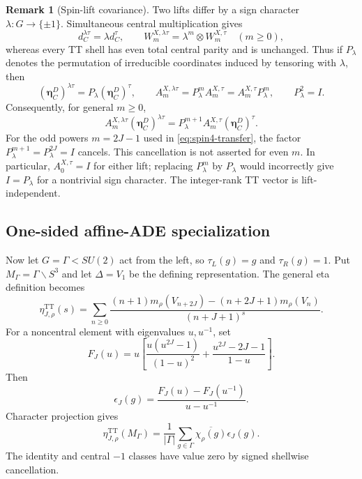 \documentclass[11pt]{article}
\theoremstyle{definition}
\newtheorem{remark}[theorem]{Remark}
\newcommand{\TT}{\mathrm{TT}}
\begin{document}
\begin{remark}[Spin-lift covariance]
Two lifts differ by a sign character $\lambda:G\to\{\pm1\}$.  Simultaneous
central multiplication gives
\[
 d_C^{\lambda\tau}=\lambda d_C^\tau,
 \qquad
 W_m^{X,\lambda\tau}=\lambda^m\otimes W_m^{X,\tau}
 \quad(m\geq0),
\]
whereas every TT shell has even total central parity and is unchanged.  Thus
if $P_\lambda$ denotes the permutation of irreducible coordinates induced by
tensoring with $\lambda$, then
\[
 (\boldsymbol\eta^D_C)^{\lambda\tau}
 =P_\lambda(\boldsymbol\eta^D_C)^\tau,
 \qquad
 A_m^{X,\lambda\tau}=P_\lambda^m A_m^{X,\tau}
 =A_m^{X,\tau}P_\lambda^m,
 \qquad P_\lambda^2=I.
\]
Consequently, for general $m\geq0$,
\[
 A_m^{X,\lambda\tau}(\boldsymbol\eta^D_C)^{\lambda\tau}
 =P_\lambda^{m+1}A_m^{X,\tau}(\boldsymbol\eta^D_C)^\tau.
\]
For the odd powers $m=2J-1$ used in \eqref{eq:spin4-transfer}, the
factor $P_\lambda^{m+1}=P_\lambda^{2J}=I$ cancels.  This cancellation
is not asserted for even $m$.  In particular, $A_0^{X,\tau}=I$ for
either lift; replacing $P_\lambda^m$ by $P_\lambda$ would incorrectly
give $I=P_\lambda$ for a nontrivial sign character.
The integer-rank TT vector is lift-independent.
\end{remark}

\subsection{One-sided affine-ADE specialization}
\label{sec:one-sided-specialization}

Now let $G=\Gamma< SU(2)$ act from the left, so
$\tau_L(g)=g$ and $\tau_R(g)=1$.  Put
$M_\Gamma=\Gamma\backslash S^3$ and let
$\Delta=V_1$ be the defining representation.  The general eta definition
becomes
\begin{equation}
 \eta^{\TT}_{J,\rho}(s)=
 \sum_{n\geq0}
 \frac{(n+1)m_\rho(V_{n+2J})-(n+2J+1)m_\rho(V_n)}
 {(n+J+1)^s}.
 \label{eq:one-sided-tt-eta-definition}
\end{equation}
For a noncentral element with eigenvalues $u,u^{-1}$, set
\begin{equation}
 F_J(u)=u\left[
 \frac{u(u^{2J}-1)}{(1-u)^2}
 +\frac{u^{2J}-2J-1}{1-u}
 \right].
 \label{eq:FJ}
\end{equation}
Then
\begin{equation}
 \epsilon_J(g)=\frac{F_J(u)-F_J(u^{-1})}{u-u^{-1}}.
 \label{eq:epsilon-density}
\end{equation}
Character projection gives
\begin{equation}
 \eta^{\TT}_{J,\rho}(M_\Gamma)=\frac1{|\Gamma|}
 \sum_{g\in\Gamma}\overline{\chi_\rho(g)}\epsilon_J(g).
 \label{eq:class-transform}
\end{equation}
The identity and central $-1$ classes have value zero by signed shellwise
cancellation.
\end{document}
